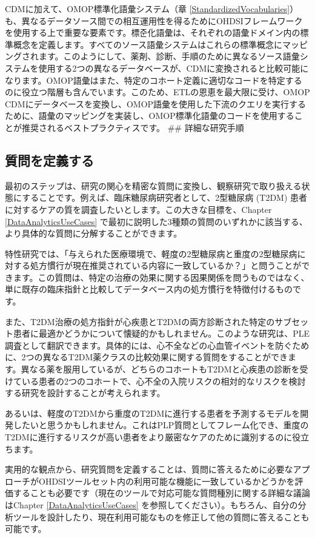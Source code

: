\documentclass[
  11pt]{book}
\theoremstyle{definition}
\theoremstyle{definition}
\theoremstyle{definition}
\theoremstyle{definition}
\theoremstyle{remark}
\begin{document}
CDMに加えて、OMOP標準化語彙システム（章 \ref{StandardizedVocabularies}）も、異なるデータソース間での相互運用性を得るためにOHDSIフレームワークを使用する上で重要な要素です。標준化語彙は、それぞれの語彙ドメイン内の標準概念を定義します。すべてのソース語彙システムはこれらの標準概念にマッピングされます。このようにして、薬剤、診断、手順のために異なるソース語彙システムを使用する2つの異なるデータベースが、CDMに変換されると比較可能になります。OMOP語彙はまた、特定のコホート定義に適切なコードを特定するのに役立つ階層も含んでいます。このため、ETLの恩恵を最大限に受け、OMOP CDMにデータベースを変換し、OMOP語彙を使用した下流のクエリを実行するために、語彙のマッピングを実装し、OMOP標準化語彙のコードを使用することが推奨されるベストプラクティスです。
\#\# 詳細な研究手順

\subsection{質問を定義する}\label{ux8ceaux554fux3092ux5b9aux7fa9ux3059ux308b}

最初のステップは、研究の関心を精密な質問に変換し、観察研究で取り扱える状態にすることです。例えば、臨床糖尿病研究者として、2型糖尿病 (T2DM) 患者に対するケアの質を調査したいとします。この大きな目標を、Chapter \ref{DataAnalyticsUseCases} で最初に説明した3種類の質問のいずれかに該当する、より具体的な質問に分解することができます。

特性研究では、「与えられた医療環境で、軽度の2型糖尿病と重度の2型糖尿病に対する処方慣行が現在推奨されている内容に一致しているか？」と問うことができます。この質問は、特定の治療の効果に関する因果関係を問うものではなく、単に既存の臨床指針と比較してデータベース内の処方慣行を特徴付けるものです。

また、T2DM治療の処方指針が心疾患とT2DMの両方診断された特定のサブセット患者に最適かどうかについて懐疑的かもしれません。このような研究は、PLE調査として翻訳できます。具体的には、心不全などの心血管イベントを防ぐために、2つの異なるT2DM薬クラスの比較効果に関する質問をすることができます。異なる薬を服用しているが、どちらのコホートもT2DMと心疾患の診断を受けている患者の2つのコホートで、心不全の入院リスクの相対的なリスクを検討する研究を設計することが考えられます。

あるいは、軽度のT2DMから重度のT2DMに進行する患者を予測するモデルを開発したいと思うかもしれません。これはPLP質問としてフレーム化でき、重度のT2DMに進行するリスクが高い患者をより厳密なケアのために識別するのに役立ちます。

実用的な観点から、研究質問を定義することは、質問に答えるために必要なアプローチがOHDSIツールセット内の利用可能な機能に一致しているかどうかを評価することも必要です（現在のツールで対応可能な質問種別に関する詳細な議論はChapter \ref{DataAnalyticsUseCases} を参照してください）。もちろん、自分の分析ツールを設計したり、現在利用可能なものを修正して他の質問に答えることも可能です。
\end{document}
